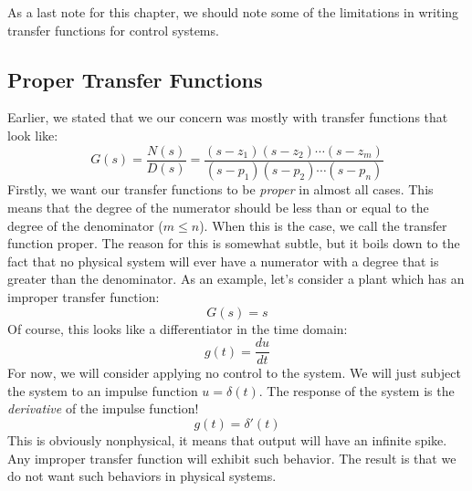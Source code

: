 As a last note for this chapter, we should note some of the limitations in writing transfer functions for control systems. 

\subsection{Proper Transfer Functions}
Earlier, we stated that we our concern was mostly with transfer functions that look like:
$$G(s)=\frac{N(s)}{D(s)}=\frac{(s-z_1)(s-z_2)\cdots(s-z_m)}{(s-p_1)(s-p_2)\cdots(s-p_n)}$$
Firstly, we want our transfer functions to be \textit{proper} in almost all cases. This means that the degree of the numerator should be less than or equal to the degree of the denominator ($m\le n$). When this is the case, we call the transfer function proper. The reason for this is somewhat subtle, but it boils down to the fact that no physical system will ever have a numerator with a degree that is greater than the denominator. As an example, let's consider a plant which has an improper transfer function:
$$G(s)=s$$
Of course, this looks like a differentiator in the time domain:
$$g(t)=\frac{du}{dt}$$
For now, we will consider applying no control to the system. We will just subject the system to an impulse function $u=\delta(t)$. The response of the system is the \textit{derivative} of the impulse function!
$$g(t)=\delta'(t)$$
This is obviously nonphysical, it means that output will have an infinite spike. Any improper transfer function will exhibit such behavior. The result is that we do not want such behaviors in physical systems. 

